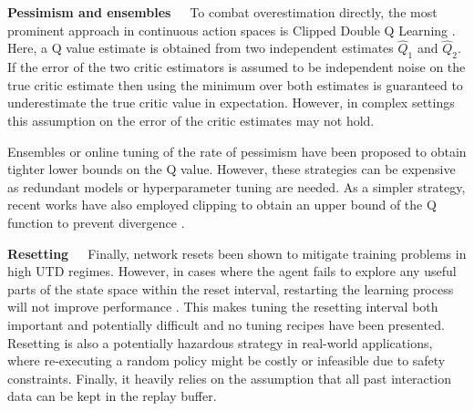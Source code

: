 \textbf{Pessimism and ensembles}~~~To combat overestimation directly, the most prominent approach in continuous action spaces is Clipped Double Q Learning \parencite{fujimoto2018addressing}. 
Here, a Q value estimate is obtained from two independent estimates $\hat{Q}_1$ and $\hat{Q}_2$.
If the error of the two critic estimators is assumed to be independent noise on the true critic estimate 
then using the minimum over both estimates is guaranteed to underestimate the true critic value in expectation.
However, in complex settings this assumption on the error of the critic estimates may not hold. 

Ensembles \parencite{lan2020maxmin,chen2021randomized,hiraoka2022dropout,farebrother2023protovalue} or online tuning of the rate of pessimism \parencite{moskovitz2021tactical} have been proposed to obtain tighter lower bounds on the Q value.
However, these strategies can be expensive as redundant models or hyperparameter tuning are needed.
As a simpler strategy, recent works have also employed clipping to obtain an upper bound of the Q function to prevent divergence \parencite{fujimoto2024sale}.

\textbf{Resetting}~~~Finally, network resets been shown to mitigate training problems \parencite{nikishin2022primacy,doro2023barrier,schwarzer2023bigger,nauman2024bigger} in high UTD regimes.
However, in cases where the agent fails to explore any useful parts of the state space within the reset interval, restarting the learning process will not improve performance \parencite{hussing2024dissecting}.
This makes tuning the resetting interval both important and potentially difficult and no tuning recipes have been presented.
Resetting is also a potentially hazardous strategy in real-world applications, where re-executing a random policy might be costly or infeasible due to safety constraints.
Finally, it heavily relies on the assumption that all past interaction data can be kept in the replay buffer.



